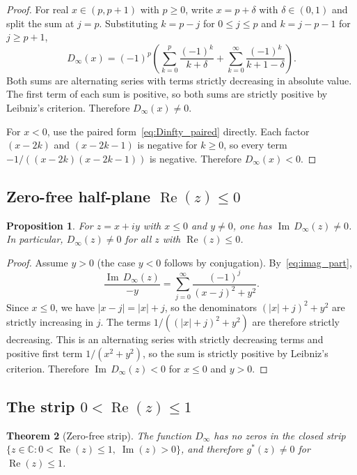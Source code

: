 \documentclass[11pt]{amsart}
\newtheorem{theorem}{Theorem}[section]
\newtheorem{proposition}[theorem]{Proposition}
\theoremstyle{definition}
\theoremstyle{remark}
\newcommand{\Real}{\operatorname{Re}}
\newcommand{\Imag}{\operatorname{Im}}
\begin{document}
\begin{proof}
For real $x \in (p, p+1)$ with $p \geq 0$, write $x = p + \delta$ with $\delta \in (0,1)$ and split the sum at $j = p$. Substituting $k = p - j$ for $0 \leq j \leq p$ and $k = j - p - 1$ for $j \geq p+1$,
$$
D_\infty(x) = (-1)^p \left(\sum_{k=0}^{p} \frac{(-1)^k}{k+\delta} + \sum_{k=0}^{\infty} \frac{(-1)^k}{k+1-\delta}\right).
$$
Both sums are alternating series with terms strictly decreasing in absolute value. The first term of each sum is positive, so both sums are strictly positive by Leibniz's criterion. Therefore $D_\infty(x) \neq 0$.

For $x < 0$, use the paired form~\eqref{eq:Dinfty_paired} directly. Each factor $(x-2k)$ and $(x-2k-1)$ is negative for $k \geq 0$, so every term $-1/((x-2k)(x-2k-1))$ is negative. Therefore $D_\infty(x) < 0$.
\end{proof}


\subsection{Zero-free half-plane $\Real(z) \leq 0$}

\begin{proposition}\label{prop:zerofree_left}
For $z = x + iy$ with $x \leq 0$ and $y \neq 0$, one has $\Imag\, D_\infty(z) \neq 0$. In particular, $D_\infty(z) \neq 0$ for all $z$ with $\Real(z) \leq 0$.
\end{proposition}

\begin{proof}
Assume $y > 0$ (the case $y < 0$ follows by conjugation). By~\eqref{eq:imag_part},
$$
\frac{\Imag\, D_\infty(z)}{-y} = \sum_{j=0}^{\infty} \frac{(-1)^j}{(x-j)^2 + y^2}.
$$
Since $x \leq 0$, we have $|x - j| = |x| + j$, so the denominators $(|x|+j)^2 + y^2$ are strictly increasing in $j$. The terms $1/((|x|+j)^2 + y^2)$ are therefore strictly decreasing. This is an alternating series with strictly decreasing terms and positive first term $1/(x^2 + y^2)$, so the sum is strictly positive by Leibniz's criterion. Therefore $\Imag\, D_\infty(z) < 0$ for $x \leq 0$ and $y > 0$.
\end{proof}


\subsection{The strip $0 < \Real(z) \leq 1$}

\begin{theorem}[Zero-free strip]\label{thm:zerofree}
The function $D_\infty$ has no zeros in the closed strip $\{z \in \mathbb{C} : 0 < \Real(z) \leq 1,\; \Imag(z) > 0\}$, and therefore $g^*(z) \neq 0$ for $\Real(z) \leq 1$.
\end{theorem}
\end{document}
